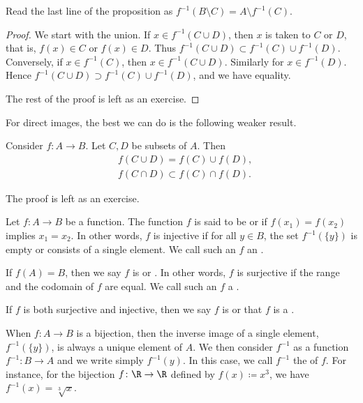 Read the last line of the proposition as
$f^{-1}( B \setminus C) = A \setminus f^{-1} (C)$.

\begin{proof}
We start with the union.  If $x \in 
f^{-1}( C \cup D)$, then 
$x$ is taken to $C$ or $D$, that is, $f(x) \in C$ or $f(x) \in D$.  Thus
$f^{-1}( C \cup D) \subset f^{-1} (C) \cup f^{-1} (D)$.  Conversely,
if $x \in f^{-1}(C)$, then $x \in f^{-1}(C \cup D)$.  Similarly for
$x \in f^{-1}(D)$.  Hence
$f^{-1}( C \cup D) \supset f^{-1} (C) \cup f^{-1} (D)$, and we have
equality.

The rest of the proof is left as an exercise.
\end{proof}

For direct images, the best we can do is the
following weaker result.

\begin{prop} \label{st:propfor}
Consider $f \colon A \to B$.  Let $C, D$ be subsets of $A$.  Then
\begin{align*}
& f( C \cup D) = f (C) \cup f (D) , \\
& f( C \cap D) \subset f (C) \cap f (D) .
\end{align*}
\end{prop}

The proof is left as an exercise.

\begin{defn}
Let $f \colon A \to B$ be a function.
The function $f$ is said to be
\emph{} or
\emph{} if $f(x_1) = f(x_2)$ implies $x_1 = x_2$.  In
other words,
$f$ is injective if
for all $y \in B$, the set
$f^{-1}(\{y\})$ is empty or consists of a single element.
We call such an $f$ an \emph{}.

If $f(A) = B$, then we say $f$ is
\emph{} or
\emph{}.
In other words, $f$ is surjective if the range and the codomain of $f$ are equal.
We call such an $f$ a \emph{}.

If $f$ is both surjective and injective, then
we say $f$ is \emph{} or that $f$ is a
\emph{}.
\end{defn}

When $f \colon A \to B$ is a bijection, then the inverse image of a single
element, $f^{-1}(\{y\})$, is always
a unique element of $A$.  We then consider $f^{-1}$ as a function
$f^{-1} \colon B \to A$ and we write simply $f^{-1}(y)$.
In this case, we call $f^{-1}$ the \emph{} of $f$.
For instance, for the bijection $f \colon \R \to \R$ defined by
$f(x) \coloneqq x^3$, we have
$f^{-1}(x) = \sqrt[3]{x}$.


